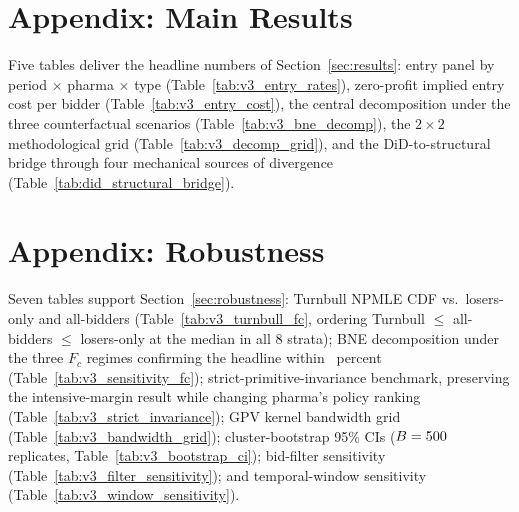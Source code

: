 \section{Appendix: Main Results}\label{app:main}

Five tables deliver the headline numbers of Section~\ref{sec:results}: entry panel by period $\times$ pharma $\times$ type (Table~\ref{tab:v3_entry_rates}), zero-profit implied entry cost per bidder (Table~\ref{tab:v3_entry_cost}), the central decomposition under the three counterfactual scenarios (Table~\ref{tab:v3_bne_decomp}), the $2 \times 2$ methodological grid (Table~\ref{tab:v3_decomp_grid}), and the DiD-to-structural bridge through four mechanical sources of divergence (Table~\ref{tab:did_structural_bridge}).







\section{Appendix: Robustness}\label{app:robust}

Seven tables support Section~\ref{sec:robustness}: Turnbull NPMLE CDF vs.\ losers-only and all-bidders (Table~\ref{tab:v3_turnbull_fc}, ordering Turnbull $\le$ all-bidders $\le$ losers-only at the median in all 8 strata); BNE decomposition under the three $F_c$ regimes confirming the headline within \turnbullDeviationPct~percent (Table~\ref{tab:v3_sensitivity_fc}); strict-primitive-invariance benchmark, preserving the intensive-margin result while changing pharma's policy ranking (Table~\ref{tab:v3_strict_invariance}); GPV kernel bandwidth grid (Table~\ref{tab:v3_bandwidth_grid}); cluster-bootstrap 95\% CIs ($B = 500$ replicates, Table~\ref{tab:v3_bootstrap_ci}); bid-filter sensitivity (Table~\ref{tab:v3_filter_sensitivity}); and temporal-window sensitivity (Table~\ref{tab:v3_window_sensitivity}).









